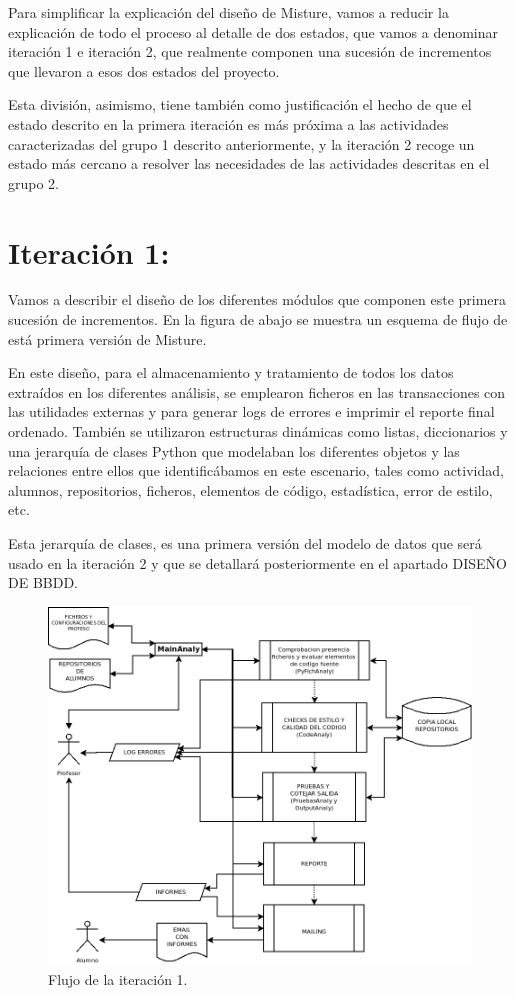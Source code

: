 Para simplificar la explicación del diseño de Misture, vamos a reducir la explicación de todo el proceso al detalle de dos estados, que vamos a denominar iteración 1 e iteración 2, que realmente componen una sucesión de incrementos que llevaron a esos dos estados del proyecto.


Esta división, asimismo, tiene también como justificación el hecho de que el estado descrito en la primera iteración es más próxima a las actividades caracterizadas del grupo 1 descrito anteriormente, y la iteración 2 recoge un estado más cercano a resolver las necesidades de las actividades descritas en el grupo 2.

\section{Iteración 1:}

Vamos a describir el diseño de los diferentes módulos que componen este primera sucesión de incrementos. En la figura de abajo se muestra un esquema de flujo de está primera versión de Misture.


En este diseño, para el almacenamiento y tratamiento de todos los datos extraídos en los diferentes análisis, se emplearon ficheros en las transacciones con las utilidades externas y para generar logs de errores e imprimir el reporte final ordenado. También se utilizaron estructuras dinámicas como listas, diccionarios y una jerarquía de clases Python que modelaban los diferentes objetos y las relaciones entre ellos que identificábamos en este escenario, tales como actividad, alumnos, repositorios, ficheros, elementos de código, estadística, error de estilo, etc.


Esta jerarquía de clases, es una primera versión del modelo de datos que será usado en la iteración 2 y que se detallará posteriormente en el apartado DISEÑO DE BBDD.



\begin{figure}[H]
   \centering
   \includegraphics[width=12cm]{img/Diagram2_iteracion1}
   \caption{Flujo de la iteración 1.}
   \label{figura:ite1}
\end{figure}


